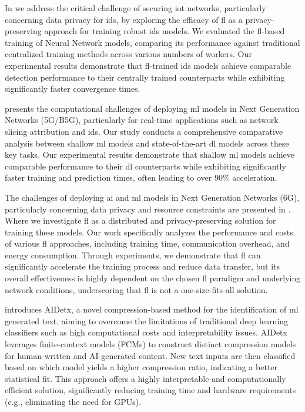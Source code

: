 In \cite{10608461} we address the critical challenge of securing \ac{iot} networks, particularly concerning data privacy for \ac{ids}, by exploring the efficacy of \ac{fl} as a privacy-preserving approach for training robust \ac{ids} models. We evaluated the \ac{fl}-based training of Neural Network models, comparing its performance against traditional centralized training methods across various numbers of workers. Our experimental results demonstrate that \ac{fl}-trained \ac{ids} models achieve comparable detection performance to their centrally trained counterparts while exhibiting significantly faster convergence times. 

\cite{teixeira2024shallow} presents the computational challenges of deploying \ac{ml} models in Next Generation Networks (5G/B5G), particularly for real-time applications such as network slicing attribution and \ac{ids}. Our study conducts a comprehensive comparative analysis between shallow \ac{ml} models and state-of-the-art \ac{dl} models across these key tasks. Our experimental results demonstrate that shallow \ac{ml} models achieve comparable performance to their \ac{dl} counterparts while exhibiting significantly faster training and prediction times, often leading to over 90\% acceleration. 

The challenges of deploying \ac{ai} and \ac{ml} models in Next Generation Networks (6G), particularly concerning data privacy and resource constraints are presented in \cite{teixeira2025efficient}. Where we investigate \ac{fl} as a distributed and privacy-preserving solution for training these models. Our work specifically analyzes the performance and costs of various \ac{fl} approaches, including training time, communication overhead, and energy consumption. Through experiments, we demonstrate that \ac{fl} can significantly accelerate the training process and reduce data transfer, but its overall effectiveness is highly dependent on the chosen \ac{fl} paradigm and underlying network conditions, underscoring that \ac{fl} is not a one-size-fits-all solution.

\cite{Almeida32025} introduces AIDetx, a novel compression-based method for the identification of \ac{ml} generated text, aiming to overcome the limitations of traditional deep learning classifiers such as high computational costs and interpretability issues. AIDetx leverages finite-context models (FCMs) to construct distinct compression models for human-written and AI-generated content. New text inputs are then classified based on which model yields a higher compression ratio, indicating a better statistical fit. This approach offers a highly interpretable and computationally efficient solution, significantly reducing training time and hardware requirements (e.g., eliminating the need for GPUs). 

